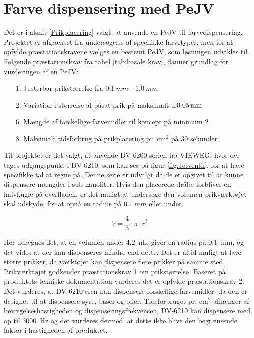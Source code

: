 \section{Farve dispensering med PeJV} \label{farvedispensering med PeJV}

Det er i afsnit \ref{Prikplacering} valgt, at anvende en PeJV til farvedispensering. Projektet er afgrænset fra undersøgelse af specifikke farvetyper, men for at opfylde præstationskravene vælges en bestemt PeJV, som løsningen udvikles til. Følgende præstationskrav fra tabel \ref{tab:basale krav}, danner grundlag for vurderingen af en PeJV:
\begin{itemize}
    \item[1.] Justerbar prikstørrelse fra \(\SI{0,1}{mm}\) - \(\SI{1,0}{mm}\)
    \item[2.] Variation i størrelse af påsat prik på maksimalt $\SI{\pm0,05}{mm}$ 
    \item[6.] Mængde af forskellige farvemidler til koncept på minimum 2
    \item[8.] Maksimalt tidsforbrug på prikplacering pr. cm\(^2\) på 30 sekunder
\end{itemize}

Til projektet er det valgt, at anvende DV-6200-serien fra VIEWEG, hvor der tages udgangspunkt i DV-6210, som kan ses på figur \ref{fig:Jetventil}, for at have specifikke tal at regne på. Denne serie er udvalgt da de er opgivet til at kunne dispensere mængder i sub-nanoliter. Hvis den placerede dråbe forbliver en halvkugle på overfladen, er det muligt at undersøge den volumen prikværktøjet skal udskyde, for at opnå en radius på $\SI{0,1}{mm}$ eller under. \parencite{VIEWEG2025JetDV-6210}

\begin{equation}
    V=\dfrac{4}{3}\cdot \pi\cdot r^3
\end{equation}

Her udregnes det, at en volumen under \SI{4,2}{nL}, giver en radius på \SI{0,1}{mm}, og det vides at der kan dispenseres mindre end dette. Det er altid muligt at lave større prikker, da værktøjet kan dispensere flere prikker på samme sted. Prikværktøjet godkender præstationskrav 1 om prikstørrelse.
Baseret på produktets tekniske dokumentation vurderes det er opfylde præstationskrav 2. Det vurderes, at DV-6210'eren kan dispensere forskellige farvemidler, da den er designet til at dispensere syre, baser og olier. Tidsforbruget pr. cm\(^2\) afhænger af bevægelseshastigheden og dispenseringsfrekvensen. DV-6210 kan dispensere med op til \SI{3000}{Hz} og det vurderes dermed, at dette ikke blive den begrænsende faktor i hastigheden af produktet.

